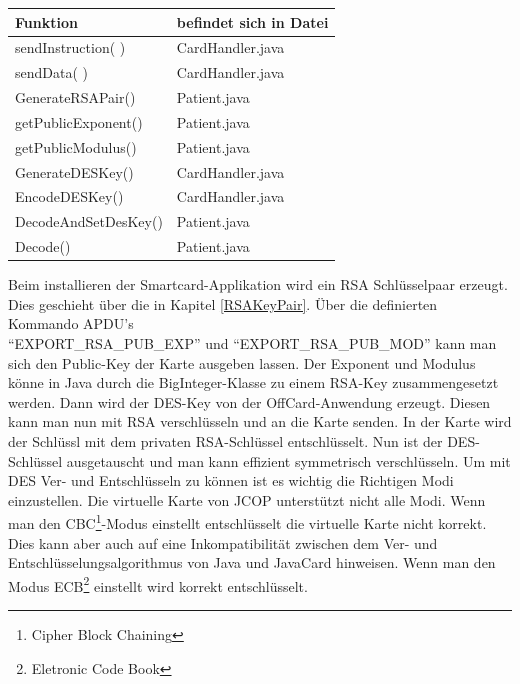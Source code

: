 \documentclass[parskip]{scrartcl}
\begin{document}
		\begin{table}[H]
			\centering
			\begin{tabular}[c]{|l|l|}
				\hline Funktion & befindet sich in Datei \\ 
				\hline
				\hline sendInstruction( ) & CardHandler.java \\ 
				\hline sendData( ) & CardHandler.java \\ 
				\hline GenerateRSAPair()  & Patient.java \\ 
				\hline getPublicExponent() & Patient.java \\ 
				\hline getPublicModulus() & Patient.java \\ 
				\hline GenerateDESKey() & CardHandler.java \\ 
				\hline EncodeDESKey() & CardHandler.java \\
				\hline DecodeAndSetDesKey() & Patient.java \\
				\hline Decode() & Patient.java \\
				\hline 
			\end{tabular} 
		\end{table}
		
		\newpage
		Beim installieren der Smartcard-Applikation wird ein RSA Schlüsselpaar erzeugt. Dies geschieht über die in Kapitel \ref{RSAKeyPair}. Über die definierten Kommando APDU's \\\enquote{EXPORT\_RSA\_PUB\_EXP} und \enquote{EXPORT\_RSA\_PUB\_MOD} kann man sich den Pub\-lic-Key der Karte ausgeben lassen. Der Exponent und Modulus könne in Java durch die BigInteger-Klasse zu einem RSA-Key zusammengesetzt werden. Dann wird der DES-Key von der OffCard-Anwendung erzeugt. Diesen kann man nun mit RSA verschlüsseln und an die Karte senden. In der Karte wird der Schlüssl mit dem privaten RSA-Schlüssel entschlüsselt. Nun ist der DES-Schlüssel ausgetauscht und man kann effizient symmetrisch verschlüsseln. Um mit DES Ver- und Entschlüsseln zu können ist es wichtig die Richtigen Modi einzustellen. Die virtuelle Karte von JCOP unterstützt nicht alle Modi. Wenn man den CBC\footnote{Cipher Block Chaining}-Modus einstellt entschlüsselt die virtuelle Karte nicht korrekt. Dies kann aber auch auf eine Inkompatibilität zwischen dem Ver- und Entschlüsselungsalgorithmus von Java und JavaCard hinweisen. Wenn man den Modus ECB\footnote{Eletronic Code Book} einstellt wird korrekt entschlüsselt. 
\end{document}
